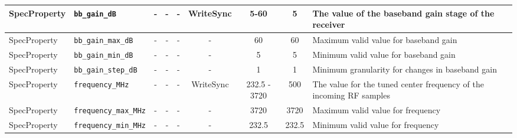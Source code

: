 \begin{landscape}
\begin{scriptsize}
\begin{tabular}{|p{2cm}|p{4cm}|c|c|c|c|c|c|p{6.5cm}|}
			\hline
			SpecProperty & \verb+bb_gain_dB+                   & -    & -        & -          & WriteSync      & 5-60         & 5       & The value of the baseband gain stage of the receiver                                                                                                                                                                        \\
			\hline
			SpecProperty & \verb+bb_gain_max_dB+               & -    & -        & -          & -              & 60           & 60      & Maximum valid value for baseband gain                                                                                                                                                                                       \\
			\hline
			SpecProperty & \verb+bb_gain_min_dB+               & -    & -        & -          & -              & 5            & 5       & Minimum valid value for baseband gain                                                                                                                                                                                       \\
			\hline
			SpecProperty & \verb+bb_gain_step_dB+              & -    & -        & -          & -              & 1            & 1       & Minimum granularity for changes in baseband gain                                                                                                                                                                            \\
			\hline
			SpecProperty & \verb+frequency_MHz+                & -    & -        & -          & WriteSync      & 232.5 - 3720 & 500     & The value for the tuned center frequency of the incoming RF samples                                                                                                                                                         \\
			\hline
			SpecProperty & \verb+frequency_max_MHz+            & -    & -        & -          & -              & 3720         & 3720    & Maximum valid value for frequency                                                                                                                                                                                           \\
			\hline
			SpecProperty & \verb+frequency_min_MHz+            & -    & -        & -          & -              & 232.5        & 232.5   & Minimum valid value for frequency                                                                                                                                                                                           \\

\end{tabular}
\end{scriptsize}
\end{landscape}
